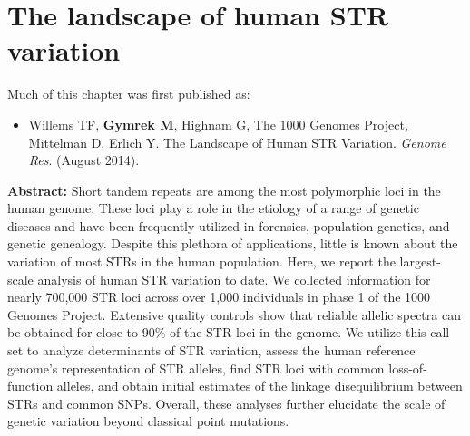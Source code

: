 \chapter{The landscape of human STR variation}

\hzline

Much of this chapter was first published as:

\begin{itemize}
\item[] Willems TF, \textbf{Gymrek M}, Highnam G, The 1000 Genomes Project, Mittelman D, Erlich Y. The
  Landscape of Human STR Variation. \emph{Genome Res}. (August 2014).
\end{itemize}

\hzline

\textbf{Abstract:} Short tandem repeats are among the most polymorphic loci in the human genome. These loci play a role in the etiology of a range of genetic diseases and have been frequently utilized in forensics, population genetics, and genetic genealogy. Despite this plethora of applications, little is known about the variation of most STRs in the human population. Here, we report the largest-scale analysis of human STR variation to date. We collected information for nearly 700,000 STR loci across over 1,000 individuals in phase 1 of the 1000 Genomes Project. Extensive quality controls show that reliable allelic spectra can be obtained for close to 90\% of the STR loci in the genome. We utilize this call set to analyze determinants of STR variation, assess the human reference genome's representation of STR alleles, find STR loci with common loss-of-function alleles, and obtain initial estimates of the linkage disequilibrium between STRs and common SNPs. Overall, these analyses further elucidate the scale of genetic variation beyond classical point mutations.

